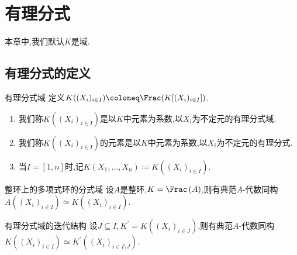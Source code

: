 \chapter{有理分式}

本章中,我们默认$K$是域.

\section{有理分式的定义}

\begin{definition}{有理分式域}{}
	定义$K((X_{i})_{i\in I})\coloneq\Frac(K[(X_{i})_{i\in I}])$.
	\begin{enumerate}
		\item 我们称$K((X_{i})_{i\in I})$是以$K$中元素为系数,以$X_{i}$为不定元的有理分式域.
		\item 我们称$K((X_{i})_{i\in I})$的元素是以$K$中元素为系数,以$X_{i}$为不定元的有理分式.
		\item 当$I=\left[1,n\right]$时,记$K(X_{1},\ldots,X_{n})\coloneq K((X_{i})_{i\in I})$.
	\end{enumerate}
\end{definition}

\begin{proposition}{整环上的多项式环的分式域}{}
	设$A$是整环,$K=\Frac\left(A\right)$,则有典范$A$-代数同构$A((X_{i})_{i\in I})\simeq K((X_{i})_{i\in I})$.
\end{proposition}

\begin{proposition}{有理分式域的迭代结构}{}
	设$J\subseteq I,K^{\prime}=K\left(\left(X_{i}\right)_{i\in J}\right)$,则有典范$A$-代数同构$K((X_{i})_{i\in I})\simeq K^{\prime}\left(\left(X_{i}\right)_{i\in I\setminus J}\right)$.
\end{proposition}



